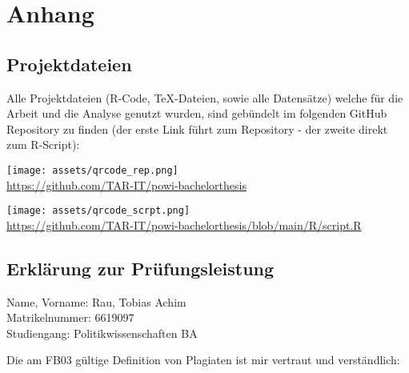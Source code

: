 \section{Anhang}


\subsection{Projektdateien}

Alle Projektdateien (R-Code, TeX-Dateien, sowie alle Datensätze) welche für die Arbeit und die 
Analyse genutzt wurden, sind gebündelt im folgenden GitHub Repository zu finden (der erste Link 
führt zum Repository - der zweite direkt zum R-Script):

\vspace{1.5cm}

\begin{center}
    \texttt{[image: assets/qrcode\_rep.png]}\\
    \vspace{.25cm}
    \small\url{https://github.com/TAR-IT/powi-bachelorthesis}
\end{center}

\vspace{1.5cm}

\begin{center}
    \texttt{[image: assets/qrcode\_scrpt.png]}\\
    \vspace{.25cm}
    \small\url{https://github.com/TAR-IT/powi-bachelorthesis/blob/main/R/script.R}
\end{center}
\newpage


\subsection{Erklärung zur Prüfungsleistung}

Name, Vorname: Rau, Tobias Achim \\
Matrikelnummer: 6619097 \\
Studiengang: Politikwissenschaften BA

\vspace{0.5cm}

Die am FB03 gültige Definition von Plagiaten ist mir vertraut und verständlich: 

